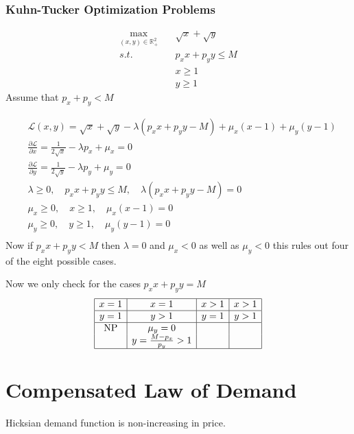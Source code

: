 \documentclass[12pt,a4paper]{article}
\begin{document}
\subsubsection{Kuhn-Tucker Optimization Problems}
\begin{tcolorbox}
    \begin{align*}
        \max_{(x,y)\in \mathbb{R}^{2}_{+}} & \quad \sqrt{x} + \sqrt{y} \\
        s.t. & \quad p_{x}x+p_{y}y \leq M\\
        & \quad x \geq 1\\
        & \quad y \geq 1
 \end{align*}
Assume that \(p_{x}+p_{y}<M \) 
\end{tcolorbox}
\begin{align*}
    &\mathcal{L}(x,y)=\sqrt{x}+\sqrt{y} - \lambda (p_{x}x+p_{y}y -M) + \mu_{x}(x-1) + \mu_{y}(y-1)\\
    &\frac{\partial \mathcal{L}}{\partial x}= \frac{1}{2\sqrt{x}} - \lambda p_{x} + \mu_{x} = 0\\
    &\frac{\partial \mathcal{L}}{\partial y}= \frac{1}{2\sqrt{y}} - \lambda p_{y} + \mu_{y} = 0\\
    &\lambda \geq 0, \quad p_{x}x+p_{y}y \leq M, \quad \lambda(p_{x}x+p_{y}y-M)=0\\
    &\mu_{x} \geq 0, \quad x \geq 1, \quad \mu_{x}(x-1)=0\\
    &\mu_{y} \geq 0, \quad y \geq 1, \quad \mu_{y}(y-1)=0\\
 \end{align*}
 Now if \(p_{x}x+p_{y}y <M\) then \(\lambda =0\) and \(\mu_{x}<0\) as well as \(\mu_{y}<0\) this rules out four of the eight possible cases.
 
 Now we only check for the cases \(p_{x}x+p_{y}y=M\)
 \begin{align*}
        \begin{array}{|c|c|c|c|}
           \hline x=1 & x=1 & x>1 & x>1\\
           \hline y=1 & y>1 & y=1 & y>1\\
           \hline \text{NP} & \mu_{y}=0 & & \\
           & y=\frac{M-p_{x}}{p_{y}}>1& &\\
           \hline
        \end{array}
\end{align*} 
\section{Compensated Law of Demand}
Hicksian demand function is non-increasing in price.
\end{document}
